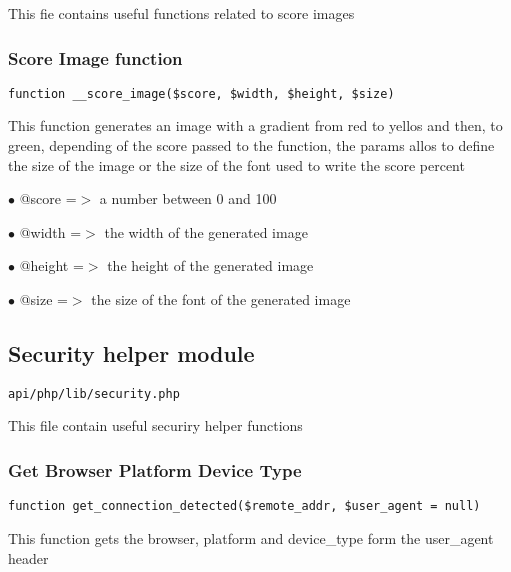 \documentclass[a4paper]{article}
\begin{document}
This fie contains useful functions related to score images

\hypertarget{toc524}{}
\subsubsection{Score Image function}

\begin{lstlisting}
function __score_image($score, $width, $height, $size)
\end{lstlisting}

This function generates an image with a gradient from red to yellos and
then, to green, depending of the score passed to the function, the params
allos to define the size of the image or the size of the font used to
write the score percent

\begin{compactitem}
\item[\color{myblue}$\bullet$] @score  =$>$ a number between 0 and 100
\item[\color{myblue}$\bullet$] @width  =$>$ the width of the generated image
\item[\color{myblue}$\bullet$] @height =$>$ the height of the generated image
\item[\color{myblue}$\bullet$] @size   =$>$ the size of the font of the generated image
\end{compactitem}

\hypertarget{toc525}{}
\subsection{Security helper module}

\begin{lstlisting}
api/php/lib/security.php
\end{lstlisting}

This file contain useful securiry helper functions

\hypertarget{toc526}{}
\subsubsection{Get Browser Platform Device Type}

\begin{lstlisting}
function get_connection_detected($remote_addr, $user_agent = null)
\end{lstlisting}

This function gets the browser, platform and device\_type form the user\_agent header
\end{document}
